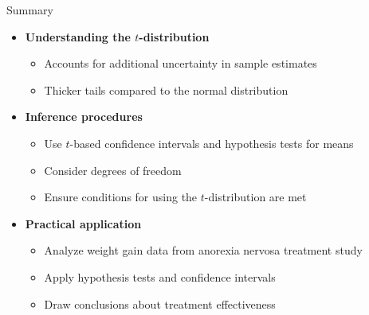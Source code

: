 \documentclass[
  ignorenonframetext,
  aspectratio=32,
]{beamer}
\providecommand{\tightlist}{%
  \setlength{\itemsep}{0pt}\setlength{\parskip}{0pt}}\usepackage{longtable,booktabs,array}
\begin{document}
\begin{frame}{Summary}
\protect\hypertarget{summary}{}
\begin{itemize}
\tightlist
\item
  \textbf{Understanding the \(t\)-distribution}

  \begin{itemize}
  \tightlist
  \item
    Accounts for additional uncertainty in sample estimates
  \item
    Thicker tails compared to the normal distribution
  \end{itemize}
\item
  \textbf{Inference procedures}

  \begin{itemize}
  \tightlist
  \item
    Use \(t\)-based confidence intervals and hypothesis tests for means
  \item
    Consider degrees of freedom
  \item
    Ensure conditions for using the \(t\)-distribution are met
  \end{itemize}
\item
  \textbf{Practical application}

  \begin{itemize}
  \tightlist
  \item
    Analyze weight gain data from anorexia nervosa treatment study
  \item
    Apply hypothesis tests and confidence intervals
  \item
    Draw conclusions about treatment effectiveness
  \end{itemize}
\end{itemize}
\end{frame}
\end{document}
